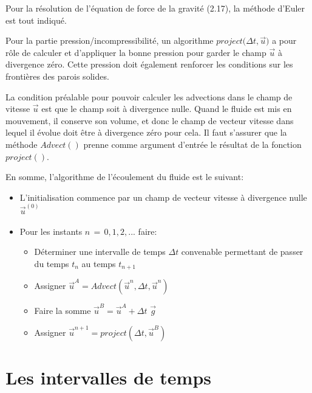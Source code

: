 \documentclass[11pt]{report}
\begin{document}
Pour la résolution de l'équation de force de la gravité (2.17), la méthode d'Euler est tout indiqué.\newline

Pour la partie pression/incompressibilité, un algorithme $ \mathit{project(\Delta t, \overrightarrow{u}}) $  a pour rôle de calculer et d'appliquer la bonne pression pour garder le champ $ \overrightarrow{u} $ à divergence zéro. Cette pression doit 
également renforcer les conditions sur les frontières des parois solides. \newline

La condition préalable pour pouvoir calculer les advections dans le champ de vitesse $  \overrightarrow{u} $ est que le champ soit à divergence nulle. Quand le fluide est mis en mouvement, il conserve son volume, et donc le champ de vecteur vitesse dans lequel il évolue doit être à divergence zéro pour cela. Il faut s'assurer que la méthode $ \mathit{Advect()} $ prenne comme argument d'entrée le résultat de la fonction $ \mathit{project()} $. \newline

En somme, l'algorithme de l'écoulement du fluide est le suivant:

\begin{itemize}
\item L'initialisation commence par un champ de vecteur vitesse à divergence nulle $ \overrightarrow{u}^{(0)} $ 
\item Pour les instants $ n \,=\, 0, 1, 2, ... $ faire:
	\begin{itemize}
		\item Déterminer une intervalle de temps $ \Delta t $ convenable permettant de passer du temps $ t_n $ au temps $ t_{n+1} $
		\item Assigner $ \overrightarrow{u}^A = Advect(\overrightarrow{u}^n, \Delta t, \overrightarrow{u}^n) $
		\item Faire la somme $ \overrightarrow{u}^B = \overrightarrow{u}^A + \Delta t \,\, \overrightarrow{g} $
		\item Assigner $ \overrightarrow{u}^{n+1} = project(\Delta t, \overrightarrow{u}^B) $
	\end{itemize}
\end{itemize}

\section{Les intervalles de temps}
\end{document}
